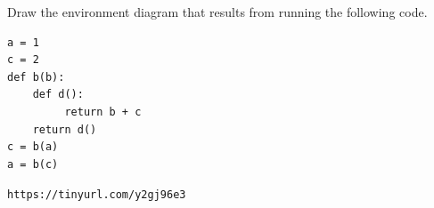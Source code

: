 \begin{blocksection}
\question Draw the environment diagram that results from running the following code.

\begin{lstlisting}
a = 1
c = 2
def b(b):
    def d():
         return b + c
    return d()
c = b(a)
a = b(c)
\end{lstlisting}

\begin{solution}[2in]
\texttt{https://tinyurl.com/y2gj96e3}
\end{solution}
\end{blocksection}
